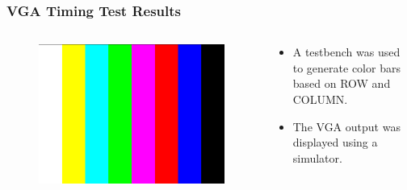 \documentclass{beamer}
\begin{document}
\begin{frame}
\frametitle{VGA Timing Test Results}

\begin{columns}[onlytextwidth]
  \begin{column}{0.5\linewidth}
  
    \begin{figure}[!htb]
      \includegraphics[width=\linewidth]{vga_timing_test_result.png}
    \end{figure}
    
  \end{column}
  \begin{column}{0.45\linewidth}
  
    \begin{itemize}
      \item A testbench was used to generate color bars based on ROW and COLUMN.
      \item The VGA output was displayed using a simulator.
    \end{itemize}
    
  \end{column}
\end{columns}

\end{frame}
\end{document}
